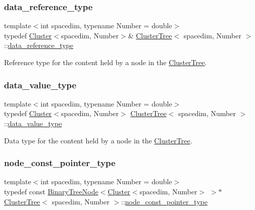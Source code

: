 \subsubsection{\texorpdfstring{data\+\_\+reference\+\_\+type}{data\_reference\_type}}
{\footnotesize\ttfamily template$<$int spacedim, typename Number = double$>$ \\
typedef \hyperlink{classCluster}{Cluster}$<$spacedim, Number$>$\& \hyperlink{classClusterTree}{Cluster\+Tree}$<$ spacedim, Number $>$\+::\hyperlink{classClusterTree_ae47bb5a21c1468972b1c2ede0e8aa28c}{data\+\_\+reference\+\_\+type}}

Reference type for the content held by a node in the \hyperlink{classClusterTree}{Cluster\+Tree}. \mbox{\label{classClusterTree_ab7875a0c5ba927d1d3c5f5212d1d524d}} 
\subsubsection{\texorpdfstring{data\+\_\+value\+\_\+type}{data\_value\_type}}
{\footnotesize\ttfamily template$<$int spacedim, typename Number = double$>$ \\
typedef \hyperlink{classCluster}{Cluster}$<$spacedim, Number$>$ \hyperlink{classClusterTree}{Cluster\+Tree}$<$ spacedim, Number $>$\+::\hyperlink{classClusterTree_ab7875a0c5ba927d1d3c5f5212d1d524d}{data\+\_\+value\+\_\+type}}

Data type for the content held by a node in the \hyperlink{classClusterTree}{Cluster\+Tree}. \mbox{\label{classClusterTree_acb805fbc20c01a71fa6a00adc959542c}} 
\subsubsection{\texorpdfstring{node\+\_\+const\+\_\+pointer\+\_\+type}{node\_const\_pointer\_type}}
{\footnotesize\ttfamily template$<$int spacedim, typename Number = double$>$ \\
typedef const \hyperlink{classBinaryTreeNode}{Binary\+Tree\+Node}$<$\hyperlink{classCluster}{Cluster}$<$spacedim, Number$>$ $>$$\ast$ \hyperlink{classClusterTree}{Cluster\+Tree}$<$ spacedim, Number $>$\+::\hyperlink{classClusterTree_acb805fbc20c01a71fa6a00adc959542c}{node\+\_\+const\+\_\+pointer\+\_\+type}}


